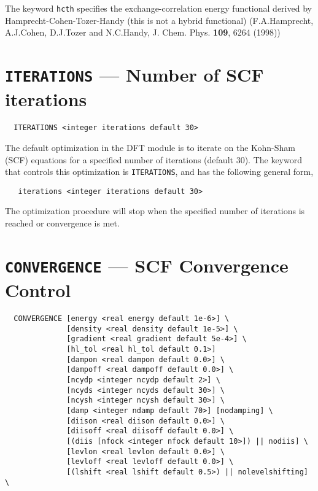 The keyword \verb+hcth+ specifies the  exchange-correlation energy 
functional derived by Hamprecht-Cohen-Tozer-Handy 
(this is not a hybrid functional)
(F.A.Hamprecht, A.J.Cohen, D.J.Tozer and N.C.Handy, 
    J. Chem. Phys. {\bf 109}, 6264 (1998))



\section{{\tt ITERATIONS} --- Number of SCF iterations}

\begin{verbatim}
  ITERATIONS <integer iterations default 30>
\end{verbatim}

The default optimization in the DFT module is to iterate on the 
Kohn-Sham (SCF) equations for a specified number of iterations
(default 30).  The keyword that controls this optimization 
is \verb+ITERATIONS+, and has the following general form,

\begin{verbatim}
   iterations <integer iterations default 30>
\end{verbatim}

The optimization procedure will stop when the specified number of
iterations is reached or convergence is met.

\section{{\tt CONVERGENCE} --- SCF Convergence Control}

\begin{verbatim}
  CONVERGENCE [energy <real energy default 1e-6>] \
              [density <real density default 1e-5>] \
              [gradient <real gradient default 5e-4>] \
              [hl_tol <real hl_tol default 0.1>]
              [dampon <real dampon default 0.0>] \
              [dampoff <real dampoff default 0.0>] \
              [ncydp <integer ncydp default 2>] \
              [ncyds <integer ncyds default 30>] \
              [ncysh <integer ncysh default 30>] \
              [damp <integer ndamp default 70>] [nodamping] \
              [diison <real diison default 0.0>] \
              [diisoff <real diisoff default 0.0>] \
              [(diis [nfock <integer nfock default 10>]) || nodiis] \
              [levlon <real levlon default 0.0>] \
              [levloff <real levloff default 0.0>] \
              [(lshift <real lshift default 0.5>) || nolevelshifting] \
\end{verbatim}

